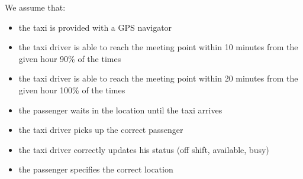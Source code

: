 We assume that:
\begin{itemize}
\item the taxi is provided with a GPS navigator
\item the taxi driver is able to reach the meeting point within 10 minutes from the given hour 90\% of the times
\item the taxi driver is able to reach the meeting point within 20 minutes from the given hour 100\% of the times
\item the passenger waits in the location until the taxi arrives
\item the taxi driver picks up the correct passenger
\item the taxi driver correctly updates his status (off shift, available, busy)
\item the passenger specifies the correct location
\end{itemize}
